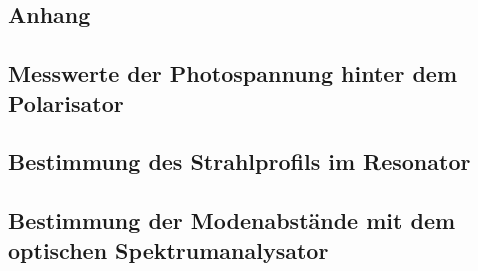\documentclass[11pt, a4paper]{article}
\numberwithin{equation}{section}
\begin{document}
\clearpage

\begin{appendix}
\section{Anhang}
\subsection{Messwerte der Photospannung hinter dem Polarisator}

\subsection{Bestimmung des Strahlprofils im Resonator}

\subsection{Bestimmung der Modenabstände mit dem optischen Spektrumanalysator}

\end{appendix}
\end{document}
